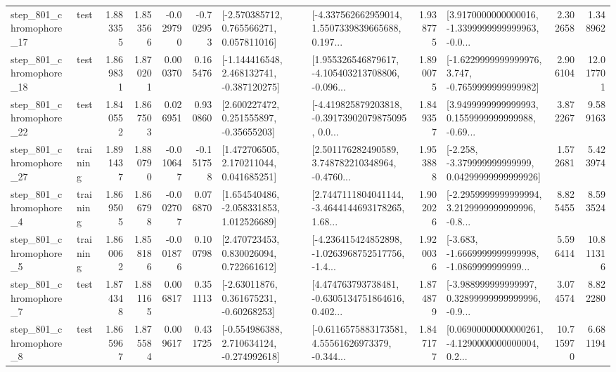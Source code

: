 \begin{tabular}{llrrrrllrlrr}
  step\_801\_chromophore\_17 &      test &      1.883355 &    1.853566 &     -0.029790 & -0.702953 &    [-2.570385712, 0.765566271, 0.057811016] &  [-4.337562662959014, 1.5507339839665688, 0.197... &       1.938775 &  [3.9170000000000016, -1.3399999999999963, -0.0... &            2.302658 &          1.348962 \\
  step\_801\_chromophore\_18 &      test &      1.869831 &    1.870201 &      0.000370 &  0.165476 &   [-1.144416548, 2.468132741, -0.387120275] &  [1.955326546879617, -4.105403213708806, -0.096... &       1.890075 &  [-1.6229999999999976, 3.747, -0.7659999999999982] &            2.906104 &         12.017701 \\
  step\_801\_chromophore\_22 &      test &      1.840552 &    1.867503 &      0.026951 &  0.930860 &     [2.600227472, 0.251555897, -0.35655203] &  [-4.419825879203818, -0.39173902079875095, 0.0... &       1.849357 &  [3.9499999999999993, 0.1559999999999988, -0.69... &            3.872267 &          9.589163 \\
  step\_801\_chromophore\_27 &  training &      1.891437 &    1.880790 &     -0.010647 & -0.151758 &     [1.472706505, 2.170211044, 0.041685251] &  [2.501176282490589, 3.748782210348964, -0.4760... &       1.953888 &  [-2.258, -3.379999999999999, 0.04299999999999926] &            1.572681 &          5.423974 \\
   step\_801\_chromophore\_4 &  training &      1.869505 &    1.866798 &     -0.002707 &  0.076870 &    [1.654540486, -2.058331853, 1.012526689] &  [2.7447111804041144, -3.4644144693178265, 1.68... &       1.902026 &  [-2.2959999999999994, 3.2129999999999996, -0.8... &            8.825455 &          8.593524 \\
   step\_801\_chromophore\_5 &  training &      1.860062 &    1.858186 &     -0.001876 &  0.100798 &     [2.470723453, 0.830026094, 0.722661612] &  [-4.236415424852898, -1.0263968752517756, -1.4... &       1.920036 &  [-3.683, -1.6669999999999998, -1.0869999999999... &            5.596414 &         10.811316 \\
   step\_801\_chromophore\_7 &      test &      1.874348 &    1.881165 &      0.006817 &  0.351113 &     [-2.63011876, 0.361675231, -0.60268253] &  [4.474763793738481, -0.6305134751864616, 0.402... &       1.874879 &  [-3.988999999999997, 0.32899999999999996, -0.9... &            3.074574 &          8.822280 \\
   step\_801\_chromophore\_8 &      test &      1.865967 &    1.875584 &      0.009617 &  0.431725 &   [-0.554986388, 2.710634124, -0.274992618] &  [-0.6116575883173581, 4.55561626973379, -0.344... &       1.847177 &  [0.06900000000000261, -4.1290000000000004, 0.2... &           10.715970 &          6.681194 \\

\end{tabular}
